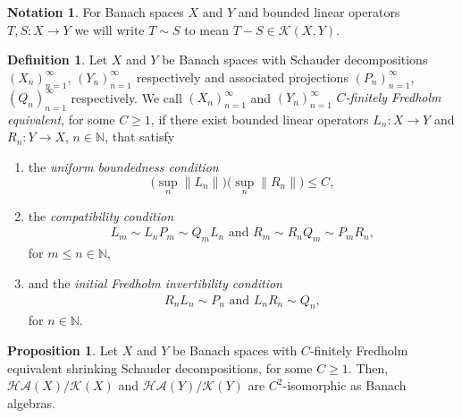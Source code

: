 \documentclass[11pt]{amsart}
\theoremstyle{definition}
\newtheorem{definition}[theorem]{Definition}
\newtheorem{proposition}[theorem]{Proposition}
\newtheorem{notation}[theorem]{Notation}
\newcommand{\N}{\mathbb{N}}
\numberwithin{equation}{section}
\begin{document}
\begin{notation}
For Banach spaces $X$ and $Y$ and bounded linear operators $T,S:X\to Y$ we will write $T\sim S$ to mean $T-S\in\mathcal{K}(X,Y)$.
\end{notation}



\begin{definition}
\label{finitely-Fredhold-equivalent}
Let $X$ and $Y$ be Banach spaces with Schauder decompositions $(X_n)_{n=1}^\infty$, $(Y_n)_{n=1}^\infty$ respectively and associated projections $(P_n)_{n=1}^\infty$, $(Q_n)_{n=1}^\infty$ respectively.
We call $(X_n)_{n=1}^\infty$ and $(Y_n)_{n=1}^\infty$ {\em $C$-finitely Fredholm equivalent}, for some $C\geq 1$, if there exist bounded linear operators $L_n:X\to Y$ and $R_n:Y\to X$, $n\in\N$, that satisfy
\begin{enumerate}[label=(\greek*)]
    
    \item\label{finitely-Fredhold-equivalent-a} the {\em uniform boundedness condition}
    \[\big(\sup_n\|L_n\|\big)\big(\sup_n\|R_n\|\big) \leq C,\]

    \item\label{finitely-Fredhold-equivalent-b} the {\em compatibility condition}
    \begin{align*}
    L_m\sim L_nP_m\sim Q_mL_n\text{ and }R_m\sim R_nQ_m\sim P_mR_n,
    \end{align*}
    for $m\leq n\in\N$,
    \item\label{finitely-Fredhold-equivalent-c} and the {\em initial Fredholm invertibility condition}
    \begin{align*}
    R_nL_n\sim P_n\text{ and }L_nR_n\sim Q_n,
    \end{align*}
    for $n\in\N$.
\end{enumerate}
\end{definition}




\begin{proposition}
\label{hor-app-by-compact isomorphism}
Let $X$ and $Y$ be Banach spaces with $C$-finitely Fredholm equivalent shrinking Schauder decompositions, for some $C\geq 1$. Then, $\mathcal{HA}(X)/\mathcal{K}(X)$ and $\mathcal{HA}(Y)/\mathcal{K}(Y)$ are $C^2$-isomorphic as Banach algebras.
\end{proposition}
\end{document}
